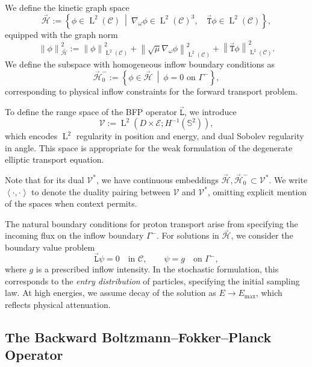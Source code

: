 \documentclass{amsart}
\newcommand{\fT}{\stackrel{_\rightarrow}{\mathtt T}}
\newcommand{\fL}{\stackrel{_\rightarrow}{\mathtt L}}
\theoremstyle{plain}
\newcommand{\Norm}[1]{\ensuremath{\left\|#1\right\|}}
\newcommand{\leb}{\text{Leb}}
\newcommand{\LL}{\ensuremath{\operatorname L}\xspace}
\renewcommand{\leb}[1]{\ensuremath{\LL^{#1}}}
\newcommand{\ltwop}[2]{\ensuremath{\!\left\langle{#1,#2}\right\rangle}}
\newcommand{\cH}{\stackrel{_\rightarrow}{\mathscr H}}
\newcommand{\cV}{\ensuremath{\mathscr V}}
\begin{document}
We define the kinetic graph space
\begin{equation}
  \cH
  :=
  \left\{
  \phi \in \leb2(\mathcal{C})
  ~\middle|~
  \nabla_\omega \phi \in \leb2(\mathcal{C})^3, \quad
  \fT \phi \in \leb2(\mathcal{C})
  \right\},
\end{equation}
equipped with the graph norm
\begin{equation}
  \Norm{\phi}_{\cH}^2
  :=
  \Norm{\phi}_{\leb2(\mathcal{C})}^2
  + \Norm{\sqrt{\mu} \nabla_\omega \phi}_{\leb2(\mathcal{C})}^2
  + \Norm{\fT \phi}_{\leb2(\mathcal{C})}^2.
\end{equation}
We define the subspace with homogeneous inflow boundary conditions as
\begin{equation}
  \cH_0^-
  :=
  \left\{
  \phi \in \cH ~\middle|~
  \phi = 0 \text{ on } \Gamma^-
  \right\},
\end{equation}
corresponding to physical inflow constraints for the forward transport
problem.

To define the range space of the BFP operator $\fL$, we introduce
\begin{equation}
  \cV := \leb2(D \times \mathcal{E}; H^{-1}(\mathbb{S}^2)),
\end{equation}
which encodes $\leb2$ regularity in position and energy, and dual
Sobolev regularity in angle. This space is appropriate for the weak
formulation of the degenerate elliptic transport equation.

Note that for its dual $\cV^*$, we have continuous embeddings $\cH,
\cH_0^- \subset \cV^*$. We write $\ltwop{\cdot}{\cdot}$ to denote the
duality pairing between $\cV$ and $\cV^*$, omitting explicit mention
of the spaces when context permits.

The natural boundary conditions for proton transport arise from
specifying the incoming flux on the inflow boundary $\Gamma^-$. For
solutions in $\cH$, we consider the boundary value problem
\begin{equation}
  \label{eq:BTE}
  \fL \psi = 0 \quad \text{in } \mathcal{C}, \qquad \psi = g \quad \text{on } \Gamma^-,
\end{equation}
where $g$ is a prescribed inflow intensity. In the stochastic
formulation, this corresponds to the \emph{entry distribution} of
particles, specifying the initial sampling law. At high energies, we
assume decay of the solution as $E \to E_{\max}$, which reflects
physical attenuation.

\subsection{The Backward Boltzmann--Fokker--Planck Operator}
\end{document}

